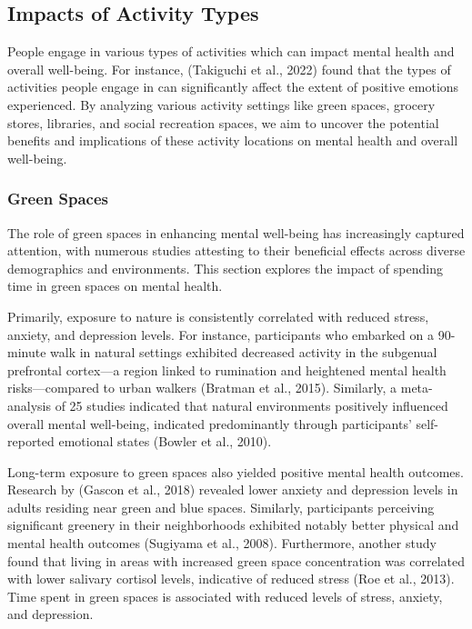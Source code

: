 \documentclass[
  letterpaper,
  number,
  review,
  3p]{elsarticle}
\begin{document}
\subsection{Impacts of Activity Types}\label{impacts-of-activity-types}

People engage in various types of activities which can impact mental
health and overall well-being. For instance, (Takiguchi et al., 2022)
found that the types of activities people engage in can significantly
affect the extent of positive emotions experienced. By analyzing various
activity settings like green spaces, grocery stores, libraries, and
social recreation spaces, we aim to uncover the potential benefits and
implications of these activity locations on mental health and overall
well-being.

\subsubsection{Green Spaces}\label{green-spaces}

The role of green spaces in enhancing mental well-being has increasingly
captured attention, with numerous studies attesting to their beneficial
effects across diverse demographics and environments. This section
explores the impact of spending time in green spaces on mental health.

Primarily, exposure to nature is consistently correlated with reduced
stress, anxiety, and depression levels. For instance, participants who
embarked on a 90-minute walk in natural settings exhibited decreased
activity in the subgenual prefrontal cortex---a region linked to
rumination and heightened mental health risks---compared to urban
walkers (Bratman et al., 2015). Similarly, a meta-analysis of 25 studies
indicated that natural environments positively influenced overall mental
well-being, indicated predominantly through participants' self-reported
emotional states (Bowler et al., 2010).

Long-term exposure to green spaces also yielded positive mental health
outcomes. Research by (Gascon et al., 2018) revealed lower anxiety and
depression levels in adults residing near green and blue spaces.
Similarly, participants perceiving significant greenery in their
neighborhoods exhibited notably better physical and mental health
outcomes (Sugiyama et al., 2008). Furthermore, another study found that
living in areas with increased green space concentration was correlated
with lower salivary cortisol levels, indicative of reduced stress (Roe
et al., 2013). Time spent in green spaces is associated with reduced
levels of stress, anxiety, and depression.
\end{document}
